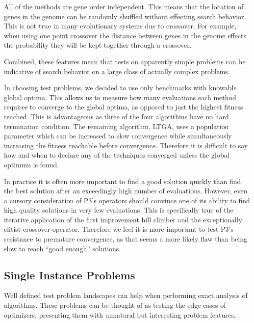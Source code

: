 \documentclass{sig-alternate}
\begin{document}
All of the methods are gene order independent.  This means that the location
of genes in the genome can be randomly shuffled without effecting search behavior.
This is not true in many evolutionary systems due to crossover.  For example,
when using one point crossover the distance between genes in the genome effects the
probability they will be kept together through a crossover.

Combined, these features mean that tests on apparently simple problems can be
indicative of search behavior on a large class of actually complex problems.

In choosing test problems, we decided to use only benchmarks with knowable global
optima.  This allows us to measure how many evaluations each method requires to converge to the
global optima, as opposed to just the highest fitness reached.  This is advantageous
as three of the four algorithms have no hard termination condition.  The remaining
algorithm, LTGA, uses a population parameter which can be increased to slow
convergence while simultaneously increasing the fitness reachable before convergence.
Therefore it is difficult to say how and when to declare any of the techniques
converged unless the global optimum is found.

In practice it is often more important to find a good solution quickly than find
the best solution after an exceedingly high number of evaluations.  However, even
a cursory consideration of P3's operators should convince one of its ability to
find high quality solutions in very few evaluations.  This is specifically true of the iterative
application of the first improvement hill climber and the exceptionally elitist
crossover operator.  Therefore we feel it is more important to test P3's resistance
to premature convergence, as that seems a more likely flaw than being slow to reach
``good enough'' solutions.

\subsection{Single Instance Problems}
Well defined test problem landscapes can help when performing exact analysis of
algorithms.  These problems can be thought of as testing the edge cases of optimizers,
presenting them with unnatural but interesting problem features.
\end{document}
